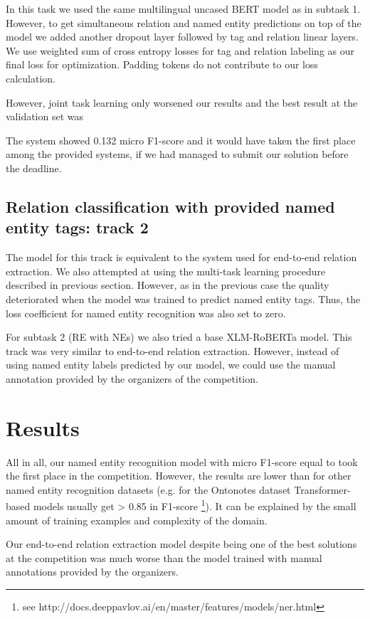 \documentclass{dialogue}
\begin{document}
In this task we used the same multilingual uncased BERT model as in subtask 1. However, to get simultaneous relation and named entity predictions on top of the model we added another dropout layer followed by tag and relation linear layers. We use weighted sum of cross entropy losses for tag and relation labeling as our final loss for optimization. Padding tokens do not contribute to our loss calculation.

However, joint task learning only worsened our results and the best result at the validation set was 

The system showed 0.132 micro F1-score and it would have taken the first place among the provided systems, if we had managed to submit our solution before the deadline.
\subsection{Relation classification with provided named entity tags: track 2}
The model for this track is equivalent to the system used for end-to-end relation extraction. We also attempted at using the multi-task learning procedure described in previous section. However, as in the previous case the quality deteriorated when the model was trained to predict named entity tags. Thus, the loss coefficient for named entity recognition was also set to zero.

For subtask 2 (RE with NEs) we also tried a base XLM-RoBERTa model. 
This track was very similar to end-to-end relation extraction. However, instead of using named entity labels predicted by our model, we could use the manual annotation provided by the organizers of the competition.

\section{Results}
All in all, our named entity recognition model with micro F1-score equal to took the first place in the competition. However, the results are lower than for other named entity recognition datasets (e.g. for the Ontonotes dataset Transformer-based models usually get > 0.85 in F1-score \footnote{see http://docs.deeppavlov.ai/en/master/features/models/ner.html}). It can be explained by the small amount of training examples and complexity of the domain.

Our end-to-end relation extraction model despite being one of the best solutions at the competition was much worse than the model trained with manual annotations provided by the organizers. 
\end{document}
